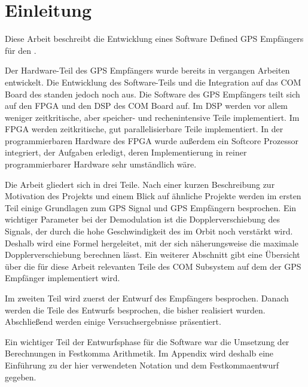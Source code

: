\chapter{Einleitung}

Diese Arbeit beschreibt die Entwicklung eines Software Defined GPS Empfängers für den \dscubesat.

Der Hardware-Teil des GPS Empfängers wurde bereits in vergangen Arbeiten entwickelt. Die Entwicklung des Software-Teils und die Integration auf das COM Board des \dscubesat standen jedoch noch aus. Die Software des GPS Empfängers teilt sich auf den FPGA und den DSP des COM Board auf. Im DSP werden vor allem weniger zeitkritische, aber speicher- und rechenintensive Teile implementiert. Im FPGA werden zeitkritische, gut parallelisierbare Teile implementiert. In der programmierbaren Hardware des FPGA wurde außerdem ein Softcore Prozessor integriert, der Aufgaben erledigt, deren Implementierung in reiner programmierbarer Hardware sehr umständlich wäre.

Die Arbeit gliedert sich in drei Teile. Nach einer kurzen Beschreibung zur Motivation des Projekts und einem Blick auf ähnliche Projekte werden im ersten Teil einige Grundlagen zum GPS Signal und GPS Empfängern besprochen. Ein wichtiger Parameter bei der Demodulation ist die Dopplerverschiebung des Signals, der durch die hohe Geschwindigkeit des \dscubesat im Orbit noch verstärkt wird. Deshalb wird eine Formel hergeleitet, mit der sich näherungsweise die maximale Dopplerverschiebung berechnen lässt. Ein weiterer Abschnitt gibt eine Übersicht über die für diese Arbeit relevanten Teile des COM Subsystem auf dem der GPS Empfänger implementiert wird.

Im zweiten Teil wird zuerst der Entwurf des Empfängers besprochen. Danach werden die Teile des Entwurfs besprochen, die bisher realisiert wurden. Abschließend werden einige Versuchsergebnisse präsentiert.

Ein wichtiger Teil der Entwurfsphase für die Software war die Umsetzung der Berechnungen in Festkomma Arithmetik. Im Appendix wird deshalb eine Einführung zu der hier verwendeten Notation und dem Festkommaentwurf gegeben.



